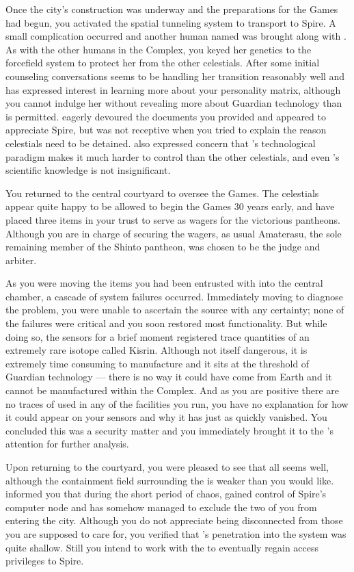 \documentclass[char]{guardians}
\begin{document}
Once the city's construction was underway and the preparations for the Games had begun, you activated the spatial tunneling system to transport \cUnity{} to Spire. A small complication occurred and another human named \cKachiko{\intro} was brought along with \cUnity{}. As with the other humans in the Complex, you keyed her genetics to the forcefield system to protect her from the other celestials. After some initial counseling conversations \cKachiko{} seems to be handling her transition reasonably well and has expressed interest in learning more about your personality matrix, although you cannot indulge her without revealing more about Guardian technology than is permitted. \cUnity{} eagerly devoured the documents you provided and appeared to appreciate Spire, but was not receptive when you tried to explain the reason celestials need to be detained. \cWarden{} also expressed concern that \cUnity{}'s technological paradigm makes it much harder to control than the other celestials, and even \cKachiko{}'s scientific knowledge is not insignificant.

You returned to the central courtyard to oversee the Games. The celestials appear quite happy to be allowed to begin the Games 30 years early, and have placed three items in your trust to serve as wagers for the victorious pantheons. Although you are in charge of securing the wagers, as usual Amaterasu, the sole remaining member of the Shinto pantheon, was chosen to be the judge and arbiter.

As you were moving the items you had been entrusted with into the central chamber, a cascade of system failures occurred. Immediately moving to diagnose the problem, you were unable to ascertain the source with any certainty; none of the failures were critical and you soon restored most functionality. But while doing so, the sensors for a brief moment registered trace quantities of an extremely rare isotope called Kisrin. Although not itself dangerous, it is extremely time consuming to manufacture and it sits at the threshold of Guardian technology --- there is no way it could have come from Earth and it cannot be manufactured within the Complex. And as you are positive there are no traces of used in any of the facilities you run, you have no explanation for how it could appear on your sensors and why it has just as quickly vanished. You concluded this was a security matter and you immediately brought it to the \cWarden{}'s attention for further analysis.

Upon returning to the courtyard, you were pleased to see that all seems well, although the containment field surrounding the \stone{} is weaker than you would like. \cWarden{} informed you that during the short period of chaos, \cUnity{} gained control of Spire's computer node and has somehow managed to exclude the two of you from entering the city. Although you do not appreciate being disconnected from those you are supposed to care for, you verified that \cUnity{}'s penetration into the system was quite shallow. Still you intend to work with the \cWarden{} to eventually regain access privileges to Spire.
\end{document}
